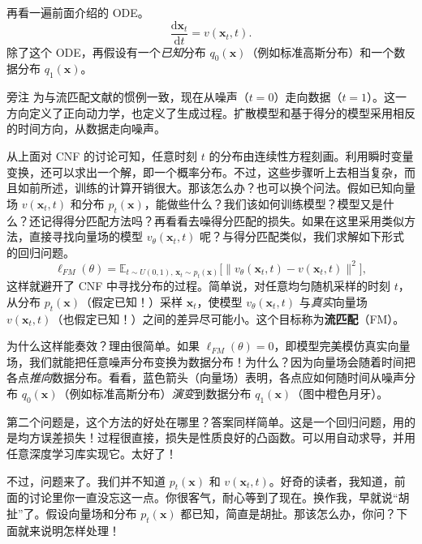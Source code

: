 再看一遍前面介绍的 ODE。
\begin{equation}
  \frac{\mathrm d\mathbf x_t}{\mathrm dt}=v(\mathbf x_t,t).
  \tag{9.59}\label{eq:09-59}
\end{equation}
除了这个 ODE，再假设有一个\emph{已知}分布 $q_0(\mathbf x)$（例如标准高斯分布）和一个数据分布 $q_1(\mathbf x)$。

\begin{booknote}{旁注}
为与流匹配文献的惯例一致，现在从噪声（$t=0$）走向数据（$t=1$）。这一方向定义了正向动力学，也定义了生成过程。扩散模型和基于得分的模型采用相反的时间方向，从数据走向噪声。
\end{booknote}

从上面对 CNF 的讨论可知，任意时刻 $t$ 的分布由连续性方程刻画。利用瞬时变量变换，还可以求出一个解，即一个概率分布。不过，这些步骤听上去相当复杂，而且如前所述，训练的计算开销很大。那该怎么办？也可以换个问法。假如已知向量场 $v(\mathbf x_t,t)$ 和分布 $p_t(\mathbf x)$，能做些什么？我们该如何训练模型？模型又是什么？还记得得分匹配方法吗？再看看去噪得分匹配的损失。如果在这里采用类似方法，直接寻找向量场的模型 $v_\theta(\mathbf x_t,t)$ 呢？与得分匹配类似，我们求解如下形式的回归问题。
\begin{equation}
  \ell_{\mathit{FM}}(\theta)=
  \mathbb E_{t\sim U(0,1),\,\mathbf x_t\sim p_t(\mathbf x)}
  \bigl[\lVert v_\theta(\mathbf x_t,t)-v(\mathbf x_t,t)\rVert^2\bigr],
  \tag{9.60}\label{eq:09-60}
\end{equation}
这样就避开了 CNF 中寻找分布的过程。简单说，对任意均匀随机采样的时刻 $t$，从分布 $p_t(\mathbf x)$（假定已知！）采样 $\mathbf x_t$，使模型 $v_\theta(\mathbf x_t,t)$ 与\emph{真实}向量场 $v(\mathbf x_t,t)$（也假定已知！）之间的差异尽可能小。这个目标称为\textbf{流匹配}（FM）。


为什么这样能奏效？理由很简单。如果 $\ell_{\mathit{FM}}(\theta)=0$，即模型完美模仿真实向量场，我们就能把任意噪声分布变换为数据分布！为什么？因为向量场会随着时间把各点\emph{推向}数据分布。看看，蓝色箭头（向量场）表明，各点应如何随时间从噪声分布 $q_0(\mathbf x)$（例如标准高斯分布）\emph{演变}到数据分布 $q_1(\mathbf x)$（图中橙色月牙）。

第二个问题是，这个方法的好处在哪里？答案同样简单。这是一个回归问题，用的是均方误差损失！过程很直接，损失是性质良好的凸函数。可以用自动求导，并用任意深度学习库实现它。太好了！

不过，问题来了。我们并不知道 $p_t(\mathbf x)$ 和 $v(\mathbf x_t,t)$。好奇的读者，我知道，前面的讨论里你一直没忘这一点。你很客气，耐心等到了现在。换作我，早就说“胡扯”了。假设向量场和分布 $p_t(\mathbf x)$ 都已知，简直是胡扯。那该怎么办，你问？下面就来说明怎样处理！

